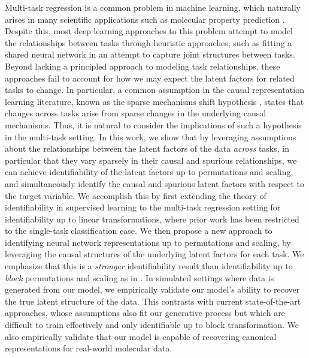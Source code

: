 \documentclass[nohyperref]{article}
\theoremstyle{plain}
\theoremstyle{definition}
\theoremstyle{remark}
\begin{document}
Multi-task regression is a common problem in machine learning, which naturally arises in many scientific applications such as molecular property prediction \citep{stanley2021fsmol,chen2023metalearning}. Despite this, most deep learning approaches to
this problem attempt to model the relationships between tasks through heuristic approaches, such as fitting a shared neural network in an attempt to capture joint structures between tasks.
Beyond lacking a principled approach to modeling task relationships, these approaches fail to account for how we may expect the latent factors for related tasks to change. In particular, a common assumption
in the causal representation learning literature, known as the sparse mechanisms shift hypothesis \citep{peters2017elements,scholkopf2019causality,scholkopf2021toward}, states that changes across tasks arise from sparse changes in the underlying causal mechanisms. Thus, it is natural
to consider the implications of such a hypothesis in the multi-task setting. In this work, we show that by leveraging assumptions about the relationships between the latent factors of the data \textit{across} 
tasks, in particular that they vary sparsely in their causal and spurious relationships, we can achieve identifiability of the latent factors up to permutations and scaling, and simultaneously identify the causal and spurious latent factors with respect to the target variable. We accomplish this by first
extending the theory of identifiability in supervised learning to the multi-task regression setting for identifiability up to linear transformations, where prior work has been restricted
to the single-task classification case. We then propose a new approach to identifying neural network representations up to permutations and scaling, by leveraging the causal structures 
of the underlying latent factors for each task. We emphasize that this is a \textit{stronger} identifiability result than identifiability up to \textit{block} permutations and scaling as in \citet{Khemakhem_Kingma_Monti_Hyvarinen_2020,Lu_Wu_Hernandez-Lobato_Scholkopf_2022}. In simulated settings where data is generated from our model, we empirically validate our model's ability to recover the true latent structure of the data. This contrasts 
with current state-of-the-art approaches, whose assumptions also fit our generative process but which are difficult to train effectively and only identifiable up to block transformation.
We also empirically validate that our model is capable of recovering canonical representations for real-world molecular data.
\end{document}
